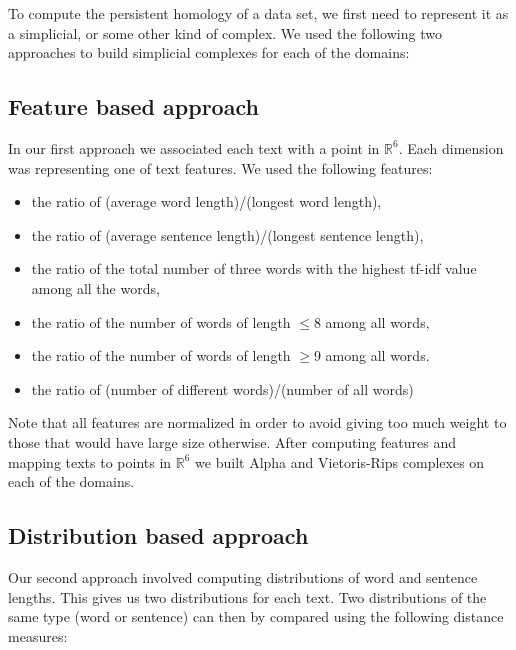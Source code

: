 \documentclass[12pt,a4paper]{amsart}
\def\R{\mathbb R}
\begin{document}
To compute the persistent homology of a data set, we first need to represent it
as a simplicial, or some other kind of complex. We used the following two
approaches to build simplicial complexes for each of the domains:

\subsection{Feature based approach}

In our first approach we associated each text with a point in $\R ^6$. Each dimension was representing one of text features. We used the following features:
\begin{itemize}
  \setlength\itemsep{0.5em}
  \item the ratio of (average word length)/(longest word length),
  \item the ratio of (average sentence length)/(longest sentence length),
  \item the ratio of the total number of three words with the highest tf-idf
    value among all the words,
  \item the ratio of the number of words of length $\le 8$ among all words,
  \item the ratio of the number of words of length $\ge 9$ among all words.
  \item the ratio of (number of different words)/(number of all words)
\end{itemize}

Note that all features are normalized in order to avoid giving too much weight 
to those that would have large size otherwise.
After computing features and mapping texts to points in $\R ^6$ we
built Alpha and Vietoris-Rips complexes on each of the domains.

\subsection{Distribution based approach}

Our second approach involved computing distributions of word and sentence
lengths. This gives us two distributions for each text. Two distributions of the same type (word or sentence) can then by compared using the following distance measures:
\end{document}
